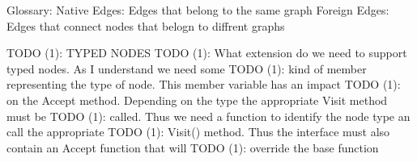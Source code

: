Glossary\+: Native Edges\+: Edges that belong to the same graph Foreign Edges\+: Edges that connect nodes that belogn to diffrent graphs

T\+O\+D\+O (1)\+: T\+Y\+P\+E\+D N\+O\+D\+E\+S T\+O\+D\+O (1)\+: What extension do we need to support typed nodes. As I understand we need some T\+O\+D\+O (1)\+: kind of member representing the type of node. This member variable has an impact T\+O\+D\+O (1)\+: on the Accept method. Depending on the type the appropriate Visit method must be T\+O\+D\+O (1)\+: called. Thus we need a function to identify the node type an call the appropriate T\+O\+D\+O (1)\+: Visit() method. Thus the interface must also contain an Accept function that will T\+O\+D\+O (1)\+: override the base function